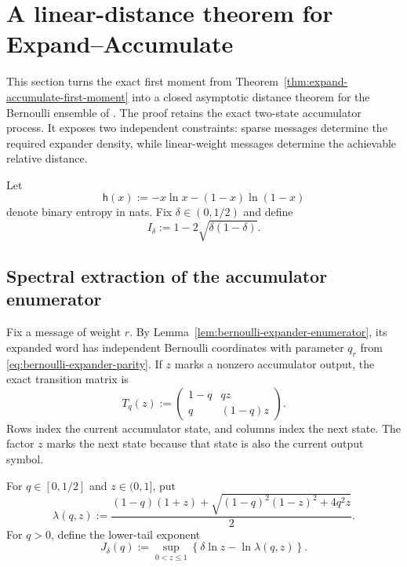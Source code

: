 \section{A linear-distance theorem for Expand--Accumulate}
\label{sec:ea-distance}

This section turns the exact first moment from
Theorem~\ref{thm:expand-accumulate-first-moment} into a closed asymptotic
distance theorem for the Bernoulli ensemble of \cite{EA}.  The proof retains
the exact two-state accumulator process.  It exposes two independent
constraints: sparse messages determine the required expander density, while
linear-weight messages determine the achievable relative distance.

Let
\begin{equation}
 \mathsf{h}(x):=-x\ln x-(1-x)\ln(1-x)
 \label{eq:binary-entropy-nats}
\end{equation}
denote binary entropy in nats.  Fix $\delta\in(0,1/2)$ and define
\begin{equation}
 I_\delta:=1-2\sqrt{\delta(1-\delta)}.
 \label{eq:ea-sparse-rate}
\end{equation}

\subsection{Spectral extraction of the accumulator enumerator}

Fix a message of weight $r$.  By
Lemma~\ref{lem:bernoulli-expander-enumerator}, its expanded word has
independent Bernoulli coordinates with parameter $q_r$ from
\eqref{eq:bernoulli-expander-parity}.  If $z$ marks a nonzero accumulator
output, the exact transition matrix is
\begin{equation}
 T_q(z):=
 \begin{pmatrix}
  1-q & qz\\
  q   & (1-q)z
 \end{pmatrix}.
 \label{eq:ea-weight-matrix}
\end{equation}
Rows index the current accumulator state, and columns index the next state.
The factor $z$ marks the next state because that state is also the current
output symbol.

For $q\in[0,1/2]$ and $z\in(0,1]$, put
\begin{equation}
 \lambda(q,z)
 :=\frac{(1-q)(1+z)
 +\sqrt{(1-q)^2(1-z)^2+4q^2z}}{2}.
 \label{eq:ea-spectral-radius}
\end{equation}
For $q>0$, define the lower-tail exponent
\begin{equation}
 J_\delta(q)
 :=\sup_{0<z\leq 1}
 \left\{\delta\ln z-\ln\lambda(q,z)\right\}.
 \label{eq:ea-tail-rate}
\end{equation}

